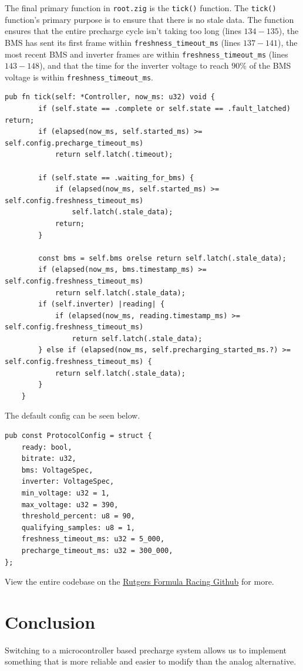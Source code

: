 \documentclass{article}
\begin{document}
The final primary function in \texttt{root.zig} is the \texttt{tick()} function. The \texttt{tick()} function's primary purpose is to ensure that there is no stale data. The function ensures that the entire precharge cycle isn't taking too long (lines $134-135$), the BMS has sent its first frame within \texttt{freshness\_timeout\_ms} (lines $137-141$), the most recent BMS and inverter frames are within \texttt{freshness\_timeout\_ms} (lines $143-148$), and that the time for the inverter voltage to reach $90\%$ of the BMS voltage is within \texttt{freshness\_timeout\_ms}.
\begin{lstlisting}[language=Zig, backgroundcolor=\color{codebg}, firstnumber=132]
    pub fn tick(self: *Controller, now_ms: u32) void {
        if (self.state == .complete or self.state == .fault_latched) return;
        if (elapsed(now_ms, self.started_ms) >= self.config.precharge_timeout_ms)
            return self.latch(.timeout);

        if (self.state == .waiting_for_bms) {
            if (elapsed(now_ms, self.started_ms) >= self.config.freshness_timeout_ms)
                self.latch(.stale_data);
            return;
        }

        const bms = self.bms orelse return self.latch(.stale_data);
        if (elapsed(now_ms, bms.timestamp_ms) >= self.config.freshness_timeout_ms)
            return self.latch(.stale_data);
        if (self.inverter) |reading| {
            if (elapsed(now_ms, reading.timestamp_ms) >= self.config.freshness_timeout_ms)
                return self.latch(.stale_data);
        } else if (elapsed(now_ms, self.precharging_started_ms.?) >= self.config.freshness_timeout_ms) {
            return self.latch(.stale_data);
        }
    }
\end{lstlisting}

The default config can be seen below.
\begin{lstlisting}[language=Zig, backgroundcolor=\color{codebg}]
pub const ProtocolConfig = struct {
    ready: bool,
    bitrate: u32,
    bms: VoltageSpec,
    inverter: VoltageSpec,
    min_voltage: u32 = 1,
    max_voltage: u32 = 390,
    threshold_percent: u8 = 90,
    qualifying_samples: u8 = 1,
    freshness_timeout_ms: u32 = 5_000,
    precharge_timeout_ms: u32 = 300_000,
};
\end{lstlisting}

View the entire codebase on the \href{https://github.com/rutgers-fsae/firmware/tree/main/precharge}{Rutgers Formula Racing Github} for more.

\section{Conclusion}
Switching to a microcontroller based precharge system allows us to implement something that is more reliable and easier to modify than the analog alternative.
\end{document}
